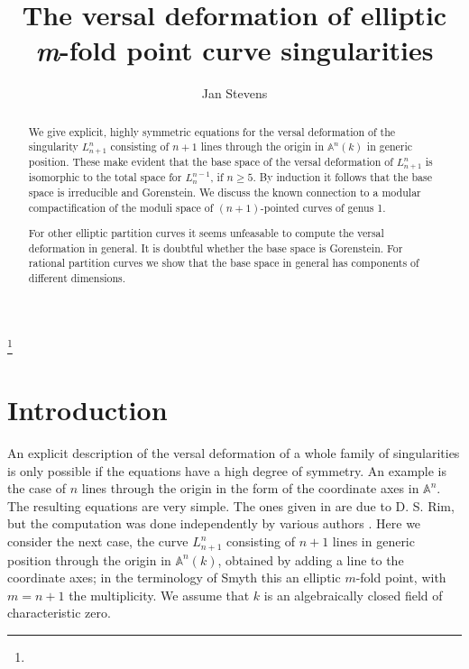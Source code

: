 \documentclass[12pt,a4paper]{amsart}  %
\newcommand{\A}{\mathbb{A}}
\theoremstyle{definition}
\theoremstyle{remark}
\begin{document}
\title[Versal deformation 
of elliptic \textit{m}-fold points]{The versal deformation 
of elliptic \textit{m}-fold point curve singularities}




\author{Jan Stevens}
\address{\scriptsize Department of Mathematical Sciences, Chalmers University of
Technology and University of Gothenburg.
SE 412 96 Gothenburg, Sweden}


\begin{abstract}
We give explicit, highly symmetric equations for the
 versal deformation of the singularity $L_{n+1}^n$ consisting
of $n+1$ lines through the origin in $\A^{n}(k)$ in generic position.  
These make evident that the base space 
of the versal deformation of $L_{n+1}^n$ is isomorphic to the
total space for $L_{n}^{n-1}$, if $n\geq 5$.
By induction it follows  that the base space
is irreducible and Gorenstein. 
We discuss the known connection to a modular compactification of the moduli space  
of $(n+1)$-pointed curves of genus 1.

For other elliptic partition curves it seems unfeasable to compute the versal deformation
in general. It is doubtful whether the base space is Gorenstein. For rational partition curves
we show that the base space in general has components of different dimensions.
\end{abstract}


\thanks{}
\maketitle


\section*{Introduction}
An explicit description of the versal deformation of a whole family of
singularities is only possible if the equations have a high degree of symmetry.
An example is the case of $n$ lines through the origin in the form 
of the coordinate axes in $\A^n$. The resulting equations are very simple. The ones given in \cite{Sch} are 
due to D. S. Rim, but the  
computation was done independently by various
authors \cite{Al,FP}. 
Here we consider the next case, 
the curve $L_{n+1}^n$
consisting of $n+1$  lines in generic position through the origin  in 
$\A^{n}(k)$, obtained by adding a line to the coordinate axes; in the terminology of
Smyth \cite{SmI} this an elliptic $m$-fold point, with $m=n+1$ the multiplicity. We assume that
$k$ is an algebraically closed 
field of characteristic zero.
\end{document}
